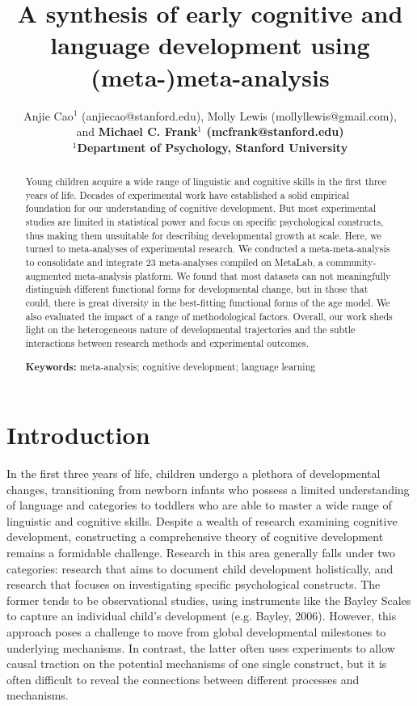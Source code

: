 \documentclass[10pt, letterpaper]{article}
\title{A synthesis of early cognitive and language development using
(meta-)meta-analysis}
\author{Anjie Cao$^1$  (anjiecao@stanford.edu), 
 Molly Lewis (mollyllewis@gmail.com), \\
 and \bf{Michael C. Frank$^1$ (mcfrank@stanford.edu)} \\
$^1$Department of Psychology, Stanford University }
\begin{document}
\maketitle

\begin{abstract}
Young children acquire a wide range of linguistic and cognitive skills
in the first three years of life. Decades of experimental work have
established a solid empirical foundation for our understanding of
cognitive development. But most experimental studies are limited in
statistical power and focus on specific psychological constructs, thus
making them unsuitable for describing developmental growth at scale.
Here, we turned to meta-analyses of experimental research. We conducted
a meta-meta-analysis to consolidate and integrate 23 meta-analyses
compiled on MetaLab, a community-augmented meta-analysis platform. We
found that most datasets can not meaningfully distinguish different
functional forms for developmental change, but in those that could,
there is great diversity in the best-fitting functional forms of the age
model. We also evaluated the impact of a range of methodological
factors. Overall, our work sheds light on the heterogeneous nature of
developmental trajectories and the subtle interactions between research
methods and experimental outcomes.

\textbf{Keywords:}
meta-analysis; cognitive development; language learning
\end{abstract}

\hypertarget{introduction}{%
\section{Introduction}\label{introduction}}

In the first three years of life, children undergo a plethora of
developmental changes, transitioning from newborn infants who possess a
limited understanding of language and categories to toddlers who are
able to master a wide range of linguistic and cognitive skills. Despite
a wealth of research examining cognitive development, constructing a
comprehensive theory of cognitive development remains a formidable
challenge. Research in this area generally falls under two categories:
research that aims to document child development holistically, and
research that focuses on investigating specific psychological
constructs. The former tends to be observational studies, using
instruments like the Bayley Scales to capture an individual child's
development (e.g. Bayley, 2006). However, this approach poses a
challenge to move from global developmental milestones to underlying
mechanisms. In contrast, the latter often uses experiments to allow
causal traction on the potential mechanisms of one single construct, but
it is often difficult to reveal the connections between different
processes and mechanisms.
\end{document}

